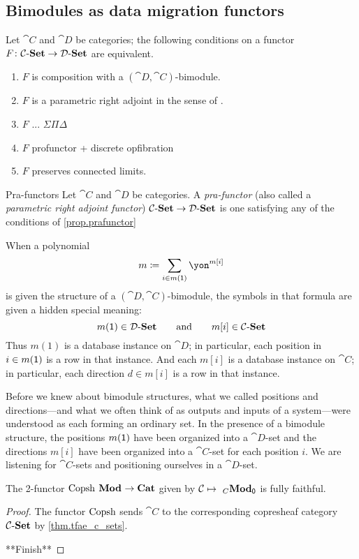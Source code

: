 \documentclass[Book-Poly]{subfiles}
\begin{document}
\subsection{Bimodules as data migration functors}


\begin{proposition}\label{prop.prafunctor}
Let $\cat{C}$ and $\cat{D}$ be categories; the following conditions on a functor $F\colon\mathcal{C}\textnormal{-}\textbf{Set}\to\mathcal{D}\textnormal{-}\textbf{Set}$ are equivalent.
\begin{enumerate}
	\item $F$ is composition with a $(\cat{D},\cat{C})$-bimodule.
	\item $F$ is a parametric right adjoint in the sense of \cite{}.
	\item $F$ ... $\Sigma\Pi\Delta$
	\item $F$ profunctor + discrete opfibration
	\item $F$ preserves connected limits.
\end{enumerate}
\end{proposition}

\begin{definition}{Pra-functors}
Let $\cat{C}$ and $\cat{D}$ be categories. A \emph{pra-functor} (also called a \emph{parametric right adjoint functor}) $\mathcal{C}\textnormal{-}\textbf{Set}\to\mathcal{D}\textnormal{-}\textbf{Set}$ is one satisfying any of the conditions of \cref{prop.prafunctor}
\end{definition}

When a polynomial
\[
m\coloneqq\sum_{i\in m(\1)}\yon^{m[i]}
\]
is given the structure of a $(\cat{D},\cat{C})$-bimodule, the symbols in that formula are given a hidden special meaning:
\[
  m(\textsf{1})\in\mathcal{D}\textnormal{-}\textbf{Set}
  \qquad\text{and}\qquad
	m[i]\in\mathcal{C}\textnormal{-}\textbf{Set}
\]
Thus $m(1)$ is a database instance on $\cat{D}$; in particular, each position in $i\in m(\textsf{1})$ is a row in that instance. And each $m[i]$ is a database instance on $\cat{C}$; in particular, each direction $d\in m[i]$ is a row in that instance.

Before we knew about bimodule structures, what we called positions and directions---and what we often think of as outputs and inputs of a system---were understood as each forming an ordinary set. In the presence of a bimodule structure, the positions $m(\textsf{1})$ have been organized into a $\cat{D}$-set and the directions $m[i]$ have been organized into a $\cat{C}$-set for each position $i$. We are listening for $\cat{C}$-sets and positioning ourselves in a $\cat{D}$-set.

\begin{theorem}
The 2-functor $\mathrm{Copsh}~_{}\textbf{Mod}_{}\to\textbf{Cat}$ given by $\mathcal{C}\mapsto~_{C}\textbf{Mod}_{\textsf{0}}$ is fully faithful.
\end{theorem}
\begin{proof}
The functor $\mathrm{Copsh}$ sends $\cat{C}$ to the corresponding copresheaf category $\mathcal{C}\textnormal{-}\textbf{Set}$ by \cref{thm.tfae_c_sets}.

**Finish**
\end{proof}
\end{document}
